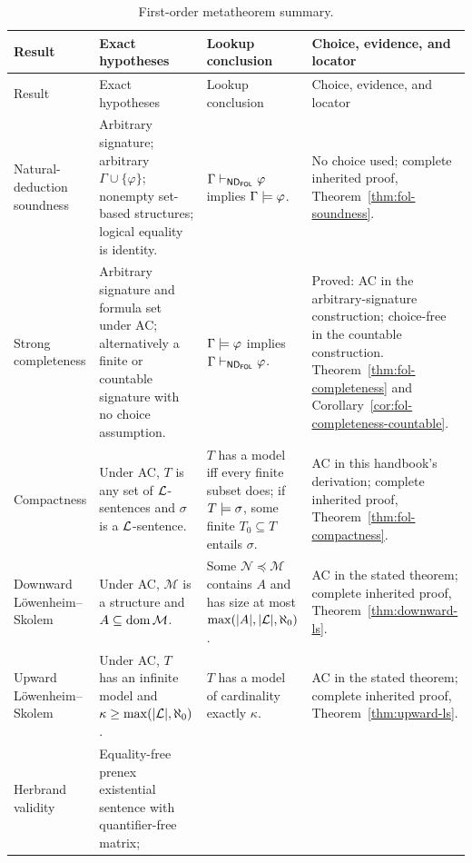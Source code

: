 \begin{landscape}
\begingroup\scriptsize\setlength{\tabcolsep}{3pt}
\begin{longtable}{@{}p{1.15in}p{2.15in}p{2.25in}p{1.65in}@{}}
\caption{First-order metatheorem summary.}
\label{tab:p02-fol-metatheorems}\\
\toprule
Result & Exact hypotheses & Lookup conclusion & Choice, evidence, and locator \\ \midrule
\endfirsthead
\toprule
Result & Exact hypotheses & Lookup conclusion & Choice, evidence, and locator \\ \midrule
\endhead
Natural-deduction soundness &
Arbitrary signature; arbitrary \(\Gamma\cup\{\varphi\}\); nonempty set-based
structures; logical equality is identity. &
\(\Gamma\vdash_{\mathsf{ND}_{\mathsf{FOL}}}\varphi\) implies
\(\Gamma\models\varphi\). &
No choice used; complete inherited proof,
Theorem~\ref{thm:fol-soundness}. \\
\addlinespace
Strong completeness &
Arbitrary signature and formula set under AC; alternatively a finite or
countable signature with no choice assumption. &
\(\Gamma\models\varphi\) implies
\(\Gamma\vdash_{\mathsf{ND}_{\mathsf{FOL}}}\varphi\). &
Proved: AC in the arbitrary-signature construction; choice-free in the
countable construction.  Theorem~\ref{thm:fol-completeness} and
Corollary~\ref{cor:fol-completeness-countable}. \\
\addlinespace
Compactness &
Under AC, \(T\) is any set of \(\mathcal{L}\)-sentences and \(\sigma\) is a
\(\mathcal{L}\)-sentence. &
\(T\) has a model iff every finite subset does; if \(T\models\sigma\), some
finite \(T_0\subseteq T\) entails \(\sigma\). &
AC in this handbook's derivation; complete inherited proof,
Theorem~\ref{thm:fol-compactness}. \\
\addlinespace
Downward L\"owenheim--Skolem &
Under AC, \(\mathcal M\) is a structure and \(A\subseteq\operatorname{dom}\mathcal M\). &
Some \(\mathcal N\preccurlyeq\mathcal M\) contains \(A\) and has size at most
\(\max(\lvert A\rvert,\lvert\mathcal{L}\rvert,\aleph_0)\). &
AC in the stated theorem; complete inherited proof,
Theorem~\ref{thm:downward-ls}. \\
\addlinespace
Upward L\"owenheim--Skolem &
Under AC, \(T\) has an infinite model and
\(\kappa\geq\max(\lvert\mathcal{L}\rvert,\aleph_0)\). &
\(T\) has a model of cardinality exactly \(\kappa\). &
AC in the stated theorem; complete inherited proof,
Theorem~\ref{thm:upward-ls}. \\
\addlinespace
Herbrand validity &
Equality-free prenex existential sentence with quantifier-free matrix;

\end{longtable}
\end{landscape}
